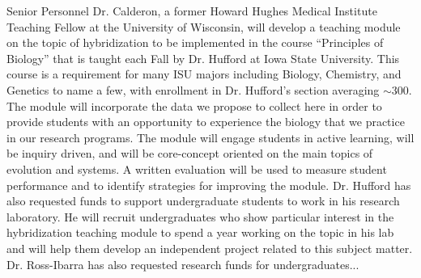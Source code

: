 Senior Personnel Dr. Calderon, a former Howard Hughes Medical Institute Teaching Fellow at the University of Wisconsin, will develop a teaching module on the topic of hybridization to be implemented in the course “Principles of Biology” that is taught each Fall by Dr. Hufford at Iowa State University.
This course is a requirement for many ISU majors including Biology, Chemistry, and Genetics to name a few, with enrollment in Dr. Hufford's section averaging $\sim$300.
The module will incorporate the data we propose to collect here in order to provide students with an opportunity to experience the biology that we practice in our research programs.
The module will engage students in active learning, will be inquiry driven, and will be core-concept oriented on the main topics of evolution and systems.
A written evaluation will be used to measure student performance and to identify strategies for improving the module.
Dr. Hufford has also requested funds to support undergraduate students to work in his research laboratory.
He will recruit undergraduates who show particular interest in the hybridization teaching module to spend a year working on the topic in his lab and will help them develop an independent project related to this subject matter.
Dr. Ross-Ibarra has also requested research funds for undergraduates...

